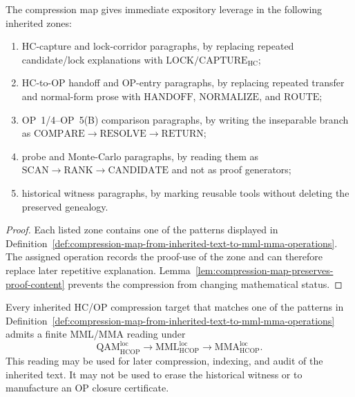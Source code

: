 \begin{proposition}
\label{prop:main-inherited-text-zones-helped-by-compression-map}
The compression map gives immediate expository leverage in the following inherited zones:
\begin{enumerate}[leftmargin=2em,label=(\roman*)]
  \item HC-capture and lock-corridor paragraphs, by replacing repeated candidate/lock explanations with \(\mathrm{LOCK}/\mathrm{CAPTURE}_{\mathrm{HC}}\);
  \item HC-to-OP handoff and OP-entry paragraphs, by replacing repeated transfer and normal-form prose with \(\mathrm{HANDOFF}\), \(\mathrm{NORMALIZE}\), and \(\mathrm{ROUTE}\);
  \item OP~1/4--OP~5(B) comparison paragraphs, by writing the inseparable branch as \(\mathrm{COMPARE}\to\mathrm{RESOLVE}\to\mathrm{RETURN}\);
  \item probe and Monte-Carlo paragraphs, by reading them as \(\mathrm{SCAN}\to\mathrm{RANK}\to\mathrm{CANDIDATE}\) and not as proof generators;
  \item historical witness paragraphs, by marking reusable tools without deleting the preserved genealogy.
\end{enumerate}
\end{proposition}

\begin{proof}
Each listed zone contains one of the patterns displayed in Definition~\ref{def:compression-map-from-inherited-text-to-mml-mma-operations}. The assigned operation records the proof-use of the zone and can therefore replace later repetitive explanation. Lemma~\ref{lem:compression-map-preserves-proof-content} prevents the compression from changing mathematical status.
\end{proof}

\begin{theorem}
\label{thm:mml-mma-compression-theorem-for-inherited-hcop-text}
Every inherited HC/OP compression target that matches one of the patterns in Definition~\ref{def:compression-map-from-inherited-text-to-mml-mma-operations} admits a finite MML/MMA reading under
\[
  \mathrm{QAM}_{\mathrm{HCOP}}^{\mathrm{loc}}
  \longrightarrow
  \mathrm{MML}_{\mathrm{HCOP}}^{\mathrm{loc}}
  \longrightarrow
  \mathrm{MMA}_{\mathrm{HCOP}}^{\mathrm{loc}}.
\]
This reading may be used for later compression, indexing, and audit of the inherited text. It may not be used to erase the historical witness or to manufacture an OP closure certificate.
\end{theorem}

